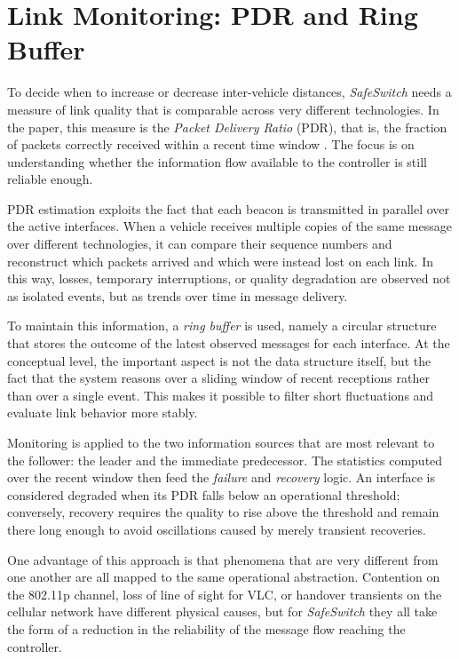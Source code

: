 \section{Link Monitoring: PDR and Ring Buffer}
\label{sec:s5g_monitoring}

To decide when to increase or decrease inter-vehicle distances, \emph{SafeSwitch} needs a measure of link quality that is comparable across very different technologies. In the paper, this measure is the \emph{Packet Delivery Ratio} (PDR), that is, the fraction of packets correctly received within a recent time window \cite{segata2023multi-technology}. The focus is on understanding whether the information flow available to the controller is still reliable enough.

PDR estimation exploits the fact that each beacon is transmitted in parallel over the active interfaces. When a vehicle receives multiple copies of the same message over different technologies, it can compare their sequence numbers and reconstruct which packets arrived and which were instead lost on each link. In this way, losses, temporary interruptions, or quality degradation are observed not as isolated events, but as trends over time in message delivery.

To maintain this information, a \emph{ring buffer} is used, namely a circular structure that stores the outcome of the latest observed messages for each interface. At the conceptual level, the important aspect is not the data structure itself, but the fact that the system reasons over a sliding window of recent receptions rather than over a single event. This makes it possible to filter short fluctuations and evaluate link behavior more stably.

Monitoring is applied to the two information sources that are most relevant to the follower: the leader and the immediate predecessor. The statistics computed over the recent window then feed the \emph{failure} and \emph{recovery} logic. An interface is considered degraded when its PDR falls below an operational threshold; conversely, recovery requires the quality to rise above the threshold and remain there long enough to avoid oscillations caused by merely transient recoveries.

One advantage of this approach is that phenomena that are very different from one another are all mapped to the same operational abstraction. Contention on the 802.11p channel, loss of line of sight for VLC, or handover transients on the cellular network have different physical causes, but for \emph{SafeSwitch} they all take the form of a reduction in the reliability of the message flow reaching the controller.
